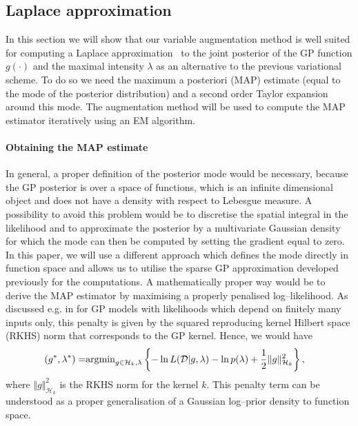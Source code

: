 \documentclass[twoside,11pt]{article}
\newcommand{\dataset}{{\cal D}}
\newcommand{\calH}{\mathcal{H}}
\begin{document}
\subsection{Laplace approximation}\label{subsec:laplace}
In this section we will show that our variable augmentation method is well suited for computing a
Laplace approximation~\citep[chap. 4]{bishop2006pattern} to the joint posterior of the GP function $g(\cdot)$ and the 
maximal intensity $\lambda$ as an alternative to the previous variational scheme. To do so we need the maximum a posteriori (MAP) estimate (equal to the mode of the posterior distribution) and a second order Taylor expansion around this mode. The augmentation method will be used to compute the MAP estimator
iteratively using an EM algorithm.

\paragraph{Obtaining the MAP estimate} 
In general, a proper definition of the posterior mode would be necessary, because the 
GP posterior is over a space of functions, which is an infinite dimensional object and does not have a 
density with respect to Lebesgue measure. A possibility to avoid this problem would be to
discretise the spatial integral in the likelihood and to approximate the posterior by a multivariate 
Gaussian density
for which the mode can then be computed by setting the gradient equal to zero.
In this paper, we will use a different approach which defines the mode directly 
in function space and allows us to utilise the sparse
GP approximation developed previously for the computations.  A mathematically proper way
would be to derive the MAP estimator by maximising a properly penalised log--likelihood. As discussed e.g.
in \citet[chap. 6]{rasmussen2006gaussian} for GP models with likelihoods which depend on finitely many 
inputs only, this penalty is given by the squared reproducing kernel Hilbert space (RKHS) norm 
that corresponds to the GP kernel. Hence, we would have
\begin{equation}\label{eq:MAP problem} 
\begin{split}
(g^*,\lambda^*) = &  {\rm argmin}_{g\in \calH_k, \lambda} \left\lbrace - \ln L(\dataset\vert g, \lambda) -\ln p(\lambda)
+ \frac{1}{2}\Vert g \Vert_{\calH_k}^2 \right\rbrace,
\end{split}
\end{equation}
where $\Vert g \Vert_{\calH_k}^2$ is the RKHS norm for the kernel $k$. 
This penalty term can be understood as a proper generalisation of a Gaussian log--prior density to function space.
\end{document}
